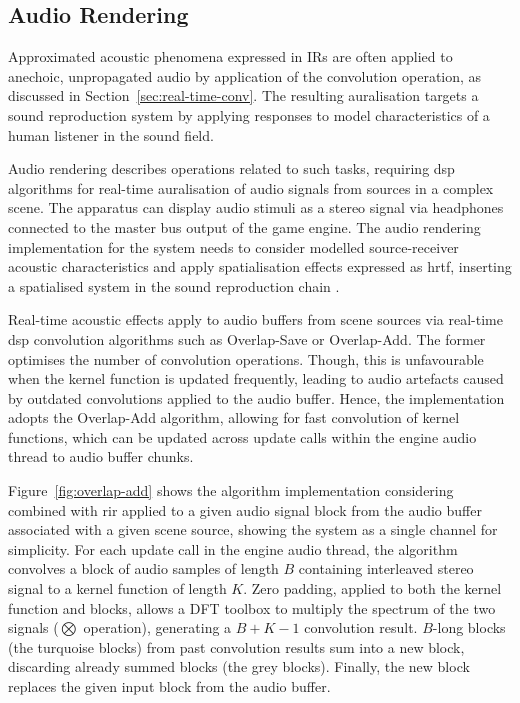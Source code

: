 \subsection{Audio Rendering}
Approximated acoustic phenomena expressed in IRs are often applied to anechoic, unpropagated audio by application of the convolution operation, as discussed in Section~\ref{sec:real-time-conv}. The resulting auralisation targets a sound reproduction system by applying responses to model characteristics of a human listener in the sound field.\par
Audio rendering describes operations related to such tasks, requiring \acrshort{dsp} algorithms for real-time auralisation of audio signals from sources in a complex scene. The apparatus can display audio stimuli as a stereo signal via headphones connected to the master bus output of the game engine. The audio rendering implementation for the system needs to consider modelled source-receiver acoustic characteristics and apply spatialisation effects expressed as \acrshort{hrtf}, inserting a spatialised system in the sound reproduction chain \citep{liu2022sound}.\par
Real-time acoustic effects apply to audio buffers from scene sources via real-time \acrshort{dsp} convolution algorithms such as Overlap-Save or Overlap-Add. The former optimises the number of convolution operations. Though, this is unfavourable when the kernel function is updated frequently, leading to audio artefacts caused by outdated convolutions applied to the audio buffer. Hence, the implementation adopts the Overlap-Add algorithm, allowing for fast convolution of kernel functions, which can be updated across update calls within the engine audio thread to audio buffer chunks.\par
Figure~\ref{fig:overlap-add} shows the algorithm implementation considering  combined with \acrshort{rir} applied to a given audio signal block from the audio buffer associated with a given scene source, showing the system as a single channel for simplicity. For each update call in the engine audio thread, the algorithm convolves a block of audio samples of length $B$ containing interleaved stereo signal to a kernel function of length $K$. Zero padding, applied to both the kernel function and blocks, allows a DFT toolbox to multiply the spectrum of the two signals ($\bigotimes$ operation), generating a $B+K-1$ convolution result. $B$-long blocks (the turquoise blocks) from past convolution results sum into a new block, discarding already summed blocks (the grey blocks). Finally, the new block replaces the given input block from the audio buffer.\par

